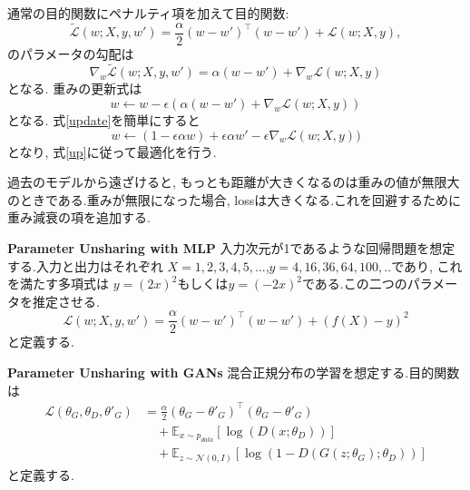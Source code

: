 \documentclass[techrep, submit, noauthor,preface]{ipsj}
\begin{document}
通常の目的関数にペナルティ項を加えて目的関数:
\begin{equation}
  \label{unshare}
  \tilde{\mathcal{L}}(w; X, y, w') =  \frac{\alpha}{2} (w - w')^{\top}(w - w')+ \mathcal{L}(w; X, y),
\end{equation}
のパラメータの勾配は
\begin{equation}
  \label{nabla}
  \nabla_{w} \tilde{ \mathcal{L}}(w; X, y, w') =  \alpha(w - w') + \nabla_{w}\mathcal{L}(w; X, y)
\end{equation}
となる.
重みの更新式は
\begin{equation}
  \label{update}
  w \leftarrow w - \epsilon (\alpha(w - w') + \nabla_{w}\mathcal{L}(w; X, y))
\end{equation}
となる.
式\ref{update}を簡単にすると
\begin{equation}
  \label{up}
  w \leftarrow (1 - \epsilon \alpha w) + \epsilon \alpha w' - \epsilon \nabla_{w}\mathcal{L}(w; X, y))
\end{equation}
となり, 式\ref{up}に従って最適化を行う.

過去のモデルから遠ざけると, もっとも距離が大きくなるのは重みの値が無限大のときである.重みが無限になった場合, lossは大きくなる.これを回避するために重み減衰の項を追加する.


{\bf Parameter Unsharing with MLP} 入力次元が1であるような回帰問題を想定する.入力と出力はそれぞれ
$X = {1, 2, 3, 4, 5,...}$,$y = {4, 16, 36, 64, 100,..}$であり, これを満たす多項式は
$y = (2x)^{2}$もしくは$y = (-2x)^{2}$である.この二つのパラメータを推定させる.
\begin{equation}
  \label{regression}
  \mathcal{L}(w; X, y, w') =  \frac{\alpha}{2} (w - w')^{\top}(w - w') + (f(X) - y)^{2} 
\end{equation}      
と定義する.

{\bf Parameter Unsharing with GANs} 混合正規分布の学習を想定する.目的関数は
\begin{equation}
  \label{gan}
  \begin{split}
  \mathcal{L}(\theta_{G}, \theta_{D}, \theta'_{G}) & =   \frac{\alpha}{2} (\theta_{G} - \theta'_{G})^{\top}(\theta_{G} - \theta'_{G})   \\
   & \quad +  \mathbb{E}_{x\sim p_{data}} [ \log(D(x; \theta_{D})) ]   \\
   & \quad + \mathbb{E}_{z\sim \mathcal{N}(0, I)} [ \log(1 - D(G(z;\theta_{G}); \theta_{D})) ]
   \end{split}
\end{equation}
と定義する.
\end{document}
